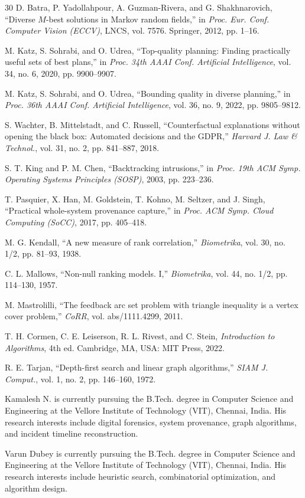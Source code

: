 \documentclass{ieeeaccess}
\begin{document}
\begin{thebibliography}{30}
 D. Batra, P. Yadollahpour, A. Guzman-Rivera, and G. Shakhnarovich, ``Diverse $M$-best solutions in Markov random fields,'' in \emph{Proc. Eur. Conf. Computer Vision (ECCV)}, LNCS, vol. 7576. Springer, 2012, pp. 1--16.

 M. Katz, S. Sohrabi, and O. Udrea, ``Top-quality planning: Finding practically useful sets of best plans,'' in \emph{Proc. 34th AAAI Conf. Artificial Intelligence}, vol. 34, no. 6, 2020, pp. 9900--9907.

 M. Katz, S. Sohrabi, and O. Udrea, ``Bounding quality in diverse planning,'' in \emph{Proc. 36th AAAI Conf. Artificial Intelligence}, vol. 36, no. 9, 2022, pp. 9805--9812.

 S. Wachter, B. Mittelstadt, and C. Russell, ``Counterfactual explanations without opening the black box: Automated decisions and the GDPR,'' \emph{Harvard J. Law \& Technol.}, vol. 31, no. 2, pp. 841--887, 2018.

 S. T. King and P. M. Chen, ``Backtracking intrusions,'' in \emph{Proc. 19th ACM Symp. Operating Systems Principles (SOSP)}, 2003, pp. 223--236.

 T. Pasquier, X. Han, M. Goldstein, T. Kohno, M. Seltzer, and J. Singh, ``Practical whole-system provenance capture,'' in \emph{Proc. ACM Symp. Cloud Computing (SoCC)}, 2017, pp. 405--418.

 M. G. Kendall, ``A new measure of rank correlation,'' \emph{Biometrika}, vol. 30, no. 1/2, pp. 81--93, 1938.

 C. L. Mallows, ``Non-null ranking models. I,'' \emph{Biometrika}, vol. 44, no. 1/2, pp. 114--130, 1957.

 M. Mastrolilli, ``The feedback arc set problem with triangle inequality is a vertex cover problem,'' \emph{CoRR}, vol. abs/1111.4299, 2011.

 T. H. Cormen, C. E. Leiserson, R. L. Rivest, and C. Stein, \emph{Introduction to Algorithms}, 4th ed. Cambridge, MA, USA: MIT Press, 2022.

 R. E. Tarjan, ``Depth-first search and linear graph algorithms,'' \emph{SIAM J. Comput.}, vol. 1, no. 2, pp. 146--160, 1972.
\end{thebibliography}




\begin{IEEEbiography}[{}]{Kamalesh N.} is currently pursuing the B.Tech. degree in Computer Science and Engineering at the Vellore Institute of Technology (VIT), Chennai, India. His research interests include digital forensics, system provenance, graph algorithms, and incident timeline reconstruction.
\end{IEEEbiography}
\begin{IEEEbiography}[{}]{Varun Dubey} is currently pursuing the B.Tech. degree in Computer Science and Engineering at the Vellore Institute of Technology (VIT), Chennai, India. His research interests include heuristic search, combinatorial optimization, and algorithm design.
\end{IEEEbiography}

\EOD
\end{document}
